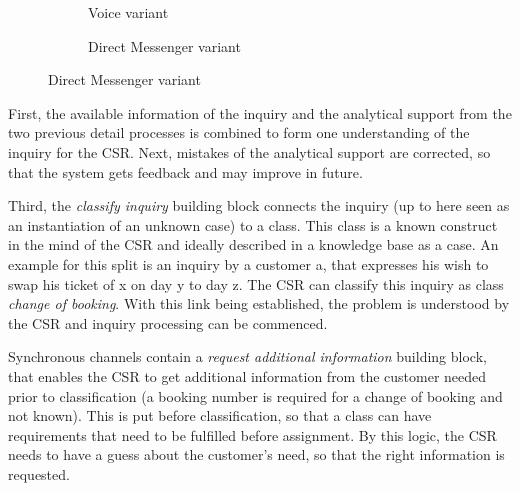 \begin{figure}[caption={classify inquiry detail process}, label={fig:inbound:class}]
\begin{subfigure}[b]{.45\textwidth}
\begin{tikzpicture}
	 		
	 		\end{tikzpicture}
	 		\caption{Voice variant}\label{fig:inbound:class:voice}
	 	\end{subfigure}
	 	\begin{subfigure}[b]{.45\textwidth}
	 		\centering	
	 		\caption{Direct Messenger variant}\label{fig:inbound:class:dm}
	 	\end{subfigure}
	 \end{figure}
	 
	 First, the available information of the inquiry and the analytical support from the two previous detail processes is combined to form one understanding of the inquiry for the \acrshort{CSR}. Next, mistakes of the analytical support are corrected, so that the system gets feedback and may improve in future.
	 
	 Third, the \textit{classify inquiry} building block connects the inquiry (up to here seen as an instantiation of an unknown case) to a class. This class is a known construct in the mind of the \acrfull{CSR} and ideally described in a knowledge base as a case. An example for this split is an inquiry by a customer a, that expresses his wish to swap his ticket of x on day y to day z. The \acrshort{CSR} can classify this inquiry as class \textit{change of booking}. With this link being established, the problem is understood by the  \acrshort{CSR} and inquiry processing can be commenced. 
	 
	 Synchronous channels contain a \textit{request additional information} building block, that enables the \acrshort{CSR} to get additional information from the customer needed prior to classification (a booking number is required for a change of booking and not known). This is put before classification, so that a class can have requirements that need to be fulfilled before assignment. By this logic, the \acrshort{CSR} needs to have a guess about the customer's need, so that the right information is requested.  
	 
